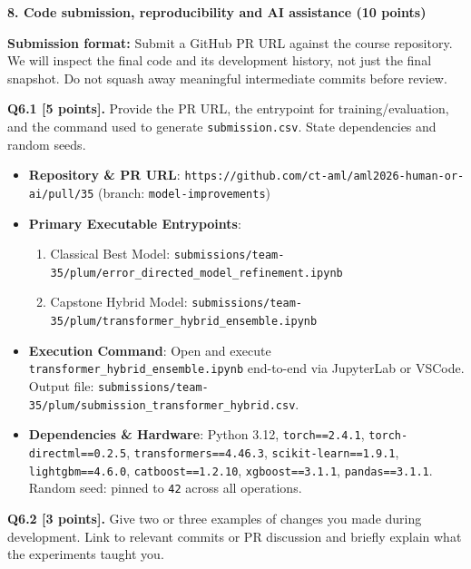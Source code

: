 \documentclass[11pt,letterpaper]{article}
\begin{document}
\vspace{12pt}
{\large\textbf{8. Code submission, reproducibility and AI assistance (10 points)}}
\vspace{2pt}

\textbf{Submission format:} Submit a GitHub PR URL against the course repository. We will inspect the final code and its development history, not just the final snapshot. Do not squash away meaningful intermediate commits before review.

\vspace{6pt}
\textbf{Q6.1 [5 points].} Provide the PR URL, the entrypoint for training/evaluation, and the command used to generate \texttt{submission.csv}. State dependencies and random seeds.

\begin{itemize}[leftmargin=*,itemsep=1pt]
    \item \textbf{Repository \& PR URL}: \texttt{https://github.com/ct-aml/aml2026-human-or-ai/pull/35} (branch: \texttt{model-improvements})
    \item \textbf{Primary Executable Entrypoints}:
    \begin{enumerate}
        \item Classical Best Model: \texttt{submissions/team-35/plum/error\_directed\_model\_refinement.ipynb}
        \item Capstone Hybrid Model: \texttt{submissions/team-35/plum/transformer\_hybrid\_ensemble.ipynb}
    \end{enumerate}
    \item \textbf{Execution Command}: Open and execute \texttt{transformer\_hybrid\_ensemble.ipynb} end-to-end via JupyterLab or VSCode. Output file: \texttt{submissions/team-35/plum/submission\_transformer\_hybrid.csv}.
    \item \textbf{Dependencies \& Hardware}: Python 3.12, \texttt{torch==2.4.1}, \texttt{torch-directml==0.2.5}, \texttt{transformers==4.46.3}, \texttt{scikit-learn==1.9.1}, \texttt{lightgbm==4.6.0}, \texttt{catboost==1.2.10}, \texttt{xgboost==3.1.1}, \texttt{pandas==3.1.1}. Random seed: pinned to \texttt{42} across all operations.
\end{itemize}

\vspace{6pt}
\textbf{Q6.2 [3 points].} Give two or three examples of changes you made during development. Link to relevant commits or PR discussion and briefly explain what the experiments taught you.
\end{document}
